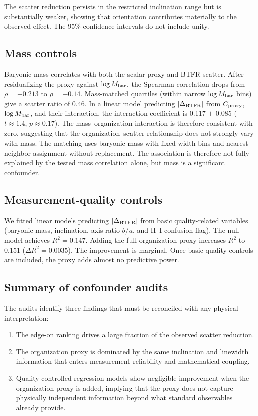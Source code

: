 \documentclass[11pt]{article}
\begin{document}
The scatter reduction persists in the restricted inclination range but is substantially weaker, showing that orientation contributes materially to the observed effect. The 95\% confidence intervals do not include unity.

\subsection{Mass controls}

Baryonic mass correlates with both the scalar proxy and BTFR scatter. After residualizing the proxy against $\log M_{\rm bar}$, the Spearman correlation drops from $\rho = -0.213$ to $\rho = -0.14$. Mass-matched quartiles (within narrow $\log M_{\rm bar}$ bins) give a scatter ratio of 0.46. In a linear model predicting $|\Delta_{\rm BTFR}|$ from $C_{\rm proxy}$, $\log M_{\rm bar}$, and their interaction, the interaction coefficient is 0.117 $\pm$ 0.085 ($t \approx 1.4$, $p \approx 0.17$). The mass--organization interaction is therefore consistent with zero, suggesting that the organization--scatter relationship does not strongly vary with mass. The matching uses baryonic mass with fixed-width bins and nearest-neighbor assignment without replacement. The association is therefore not fully explained by the tested mass correlation alone, but mass is a significant confounder.

\subsection{Measurement-quality controls}

We fitted linear models predicting $|\Delta_{\rm BTFR}|$ from basic quality-related variables (baryonic mass, inclination, axis ratio $b/a$, and H~I confusion flag). The null model achieves $R^2 = 0.147$. Adding the full organization proxy increases $R^2$ to 0.151 ($\Delta R^2 = 0.0035$). The improvement is marginal. Once basic quality controls are included, the proxy adds almost no predictive power.

\subsection{Summary of confounder audits}

The audits identify three findings that must be reconciled with any physical interpretation:

\begin{enumerate}
\item The edge-on ranking drives a large fraction of the observed scatter reduction.
\item The organization proxy is dominated by the same inclination and linewidth information that enters measurement reliability and mathematical coupling.
\item Quality-controlled regression models show negligible improvement when the organization proxy is added, implying that the proxy does not capture physically independent information beyond what standard observables already provide.
\end{enumerate}
\end{document}
